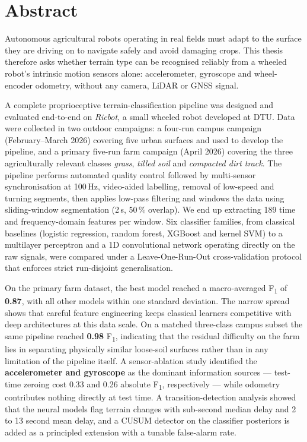 \section*{Abstract}

Autonomous agricultural robots operating in real fields must adapt to the surface they are driving on to navigate safely and avoid damaging crops. This thesis therefore asks whether terrain type can be recognised reliably from a wheeled robot's intrinsic motion sensors alone: accelerometer, gyroscope and wheel-encoder odometry, without any camera, LiDAR or GNSS signal.

A complete proprioceptive terrain-classification pipeline was designed and evaluated end-to-end on \emph{Ricbot}, a small wheeled robot developed at DTU. Data were collected in two outdoor campaigns: a four-run campus campaign (February–March 2026) covering five urban surfaces and used to develop the pipeline, and a primary five-run farm campaign (April 2026) covering the three agriculturally relevant classes \emph{grass}, \emph{tilled soil} and \emph{compacted dirt track}. The pipeline performs automated quality control followed by multi-sensor synchronisation at 100\,Hz, video-aided labelling, removal of low-speed and turning segments, then applies low-pass filtering and windows the data using sliding-window segmentation (2\,s, 50\,\% overlap). We end up extracting 189 time and frequency-domain features per window. Six classifier families, from classical baselines (logistic regression, random forest, XGBoost and kernel SVM) to a multilayer perceptron and a 1D convolutional network operating directly on the raw signals, were compared under a Leave-One-Run-Out cross-validation protocol that enforces strict run-disjoint generalisation.

On the primary farm dataset, the best model reached a macro-averaged F\textsubscript{1} of \textbf{0.87}, with all other models within one standard deviation. The narrow spread shows that careful feature engineering keeps classical learners competitive with deep architectures at this data scale. On a matched three-class campus subset the same pipeline reached \textbf{0.98} F\textsubscript{1}, indicating that the residual difficulty on the farm lies in separating physically similar loose-soil surfaces rather than in any limitation of the pipeline itself. A sensor-ablation study identified the \textbf{accelerometer and gyroscope} as the dominant information sources — test-time zeroing cost 0.33 and 0.26 absolute F\textsubscript{1}, respectively — while odometry contributes nothing directly at test time. A transition-detection analysis showed that the neural models flag terrain changes with sub-second median delay and 2 to 13 second mean delay, and a CUSUM detector on the classifier posteriors is added as a principled extension with a tunable false-alarm rate.


